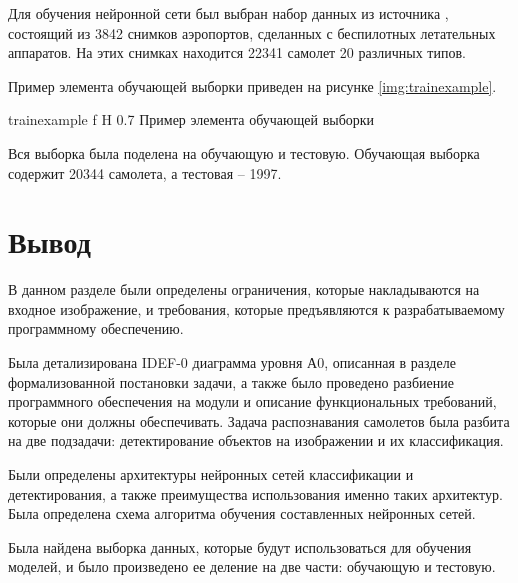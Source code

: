 Для обучения нейронной сети был выбран набор данных из источника \cite{planesdataset}, состоящий из 3842 снимков аэропортов, сделанных с беспилотных летательных аппаратов. На этих снимках находится 22341 самолет 20 различных типов.

Пример элемента обучающей выборки приведен на рисунке \ref{img:trainexample}.

{trainexample} %
{f} %
{H} %
{0.7\textwidth} %
{Пример элемента обучающей выборки} %


Вся выборка была поделена на обучающую и тестовую. Обучающая выборка содержит 20344 самолета, а тестовая -- 1997.

\section{Вывод}

В данном разделе были определены ограничения, которые накладываются на входное изображение, и требования, которые предъявляются к разрабатываемому программному обеспечению.

Была детализирована IDEF-0 диаграмма уровня А0, описанная в разделе формализованной постановки задачи, а также было проведено разбиение программного обеспечения на модули и описание функциональных требований, которые они должны обеспечивать. Задача распознавания самолетов была разбита на две подзадачи: детектирование объектов на изображении и их классификация.

Были определены архитектуры нейронных сетей классификации и детектирования, а также преимущества использования именно таких архитектур. Была определена схема алгоритма обучения составленных нейронных сетей.

Была найдена выборка данных, которые будут использоваться для обучения моделей, и было произведено ее деление на две части: обучающую и тестовую.